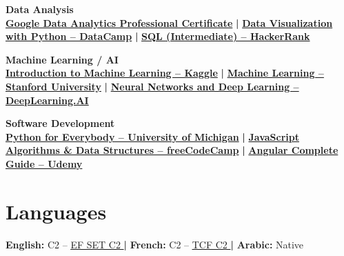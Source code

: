 \documentclass[11pt]{article}
\begin{document}
\textbf{Data Analysis} \\
\href{https://www.coursera.org/professional-certificates/google-data-analytics}{\textbf{Google Data Analytics Professional Certificate}} \textbf{ | }
\href{https://www.datacamp.com/courses/data-visualization-with-python}{\textbf{Data Visualization with Python – DataCamp}} \textbf{ | }
\href{https://www.hackerrank.com/skills-verification/sql_intermediate}{\textbf{SQL (Intermediate) – HackerRank}}
\vspace{0.2cm}

\textbf{Machine Learning / AI} \\
\href{https://www.kaggle.com/learn/intro-to-machine-learning}{\textbf{Introduction to Machine Learning – Kaggle}} \textbf{ | }
\href{https://www.coursera.org/learn/machine-learning}{\textbf{Machine Learning – Stanford University}} \textbf{ | }
\href{https://www.coursera.org/learn/neural-networks-deep-learning}{\textbf{Neural Networks and Deep Learning – DeepLearning.AI}}
\vspace{0.2cm}

\textbf{Software Development} \\
\href{https://www.coursera.org/specializations/python}{\textbf{Python for Everybody – University of Michigan}} \textbf{ | }
\href{https://www.freecodecamp.org/learn/javascript-algorithms-and-data-structures/}{\textbf{JavaScript Algorithms \& Data Structures – freeCodeCamp}} \textbf{ | }
\href{https://www.udemy.com/course/angular-complete-guide/}{\textbf{Angular Complete Guide – Udemy}}

\section*{Languages}
\textbf{English:} C2 – \href{https://cert.efset.org/6YsT6y}{\underline{EF SET C2} \faLink} \textbf{ | }
\textbf{French:} C2 – \href{https://www.france-education-international.fr/test/dalf}{\underline{TCF C2} \faLink} \textbf{ | }
\textbf{Arabic:} Native

\vspace{-0.3cm}
\end{document}
